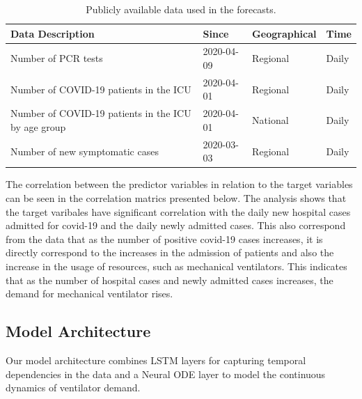 \documentclass[lettersize, journal]{IEEEtran}
\begin{document}
\begin{table}[h]
    \centering
    \caption{Publicly available data used in the forecasts.}
    \begin{tabular}{|l|l|l|l|}
    \hline
    \textbf{Data Description} & \textbf{Since} & \textbf{Geographical} & \textbf{Time} \\ \hline
    Number of PCR tests & 2020-04-09 & Regional & Daily \\ \hline
    Number of COVID-19 patients in the ICU & 2020-04-01 & Regional & Daily \\ \hline
    Number of COVID-19 patients in the ICU by age group & 2020-04-01 & National & Daily \\ \hline
    Number of new symptomatic cases & 2020-03-03 & Regional & Daily \\ \hline
    \end{tabular}
    \label{table:data_forecasts}
    \end{table}

The correlation between the predictor variables in relation to the target variables can be seen in the correlation matrics presented below. The analysis shows that the target varibales have significant correlation with the daily new hospital cases admitted for covid-19 and the daily newly admitted cases. This also correspond from the data that as the number of positive covid-19 cases increases, it is directly correspond to the increases in the admission of patients and also the increase in the usage of resources, such as mechanical ventilators. This indicates that as the number of hospital cases and newly admitted cases increases, the demand for mechanical ventilator rises.

\subsection{Model Architecture}
Our model architecture combines LSTM layers for capturing temporal dependencies in the data and a Neural ODE layer to model the continuous dynamics of ventilator demand.




\end{document}
